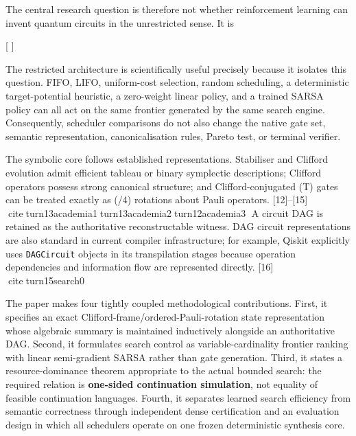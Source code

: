\documentclass[
]{article}
\begin{document}
The central research question is therefore not whether reinforcement
learning can invent quantum circuits in the unrestricted sense. It is

{[}   {]}

The restricted architecture is scientifically useful precisely because
it isolates this question. FIFO, LIFO, uniform-cost selection, random
scheduling, a deterministic target-potential heuristic, a zero-weight
linear policy, and a trained SARSA policy can all act on the same
frontier generated by the same search engine. Consequently, scheduler
comparisons do not also change the native gate set, semantic
representation, canonicalisation rules, Pareto test, or terminal
verifier.

The symbolic core follows established representations. Stabiliser and
Clifford evolution admit efficient tableau or binary symplectic
descriptions; Clifford operators possess strong canonical structure; and
Clifford-conjugated (T) gates can be treated exactly as (\pi/4)
rotations about Pauli operators. {[}12{]}--{[}15{]}
citeturn13academia1turn13academia2turn12academia3 A circuit DAG is
retained as the authoritative reconstructable witness. DAG circuit
representations are also standard in current compiler infrastructure;
for example, Qiskit explicitly uses \texttt{DAGCircuit} objects in its
transpilation stages because operation dependencies and information flow
are represented directly. {[}16{]} citeturn15search0

The paper makes four tightly coupled methodological contributions.
First, it specifies an exact Clifford-frame/ordered-Pauli-rotation state
representation whose algebraic summary is maintained inductively
alongside an authoritative DAG. Second, it formulates search control as
variable-cardinality frontier ranking with linear semi-gradient SARSA
rather than gate generation. Third, it states a resource-dominance
theorem appropriate to the actual bounded search: the required relation
is \textbf{one-sided continuation simulation}, not equality of feasible
continuation languages. Fourth, it separates learned search efficiency
from semantic correctness through independent dense certification and an
evaluation design in which all schedulers operate on one frozen
deterministic synthesis core.
\end{document}
